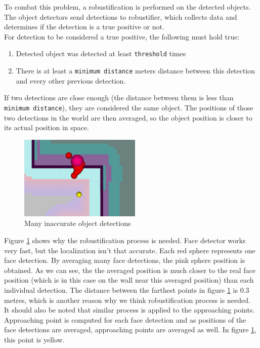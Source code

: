 \documentclass[12pt,a4paper]{article}
\begin{document}
	To combat this problem, a robustification is performed on the detected objects. The object detectors send detections to robustifier, which collects data and determines if the detection is a true positive or not. \\
	
	For detection to be considered a true positive, the following must hold true:
	\begin{enumerate}
		\item Detected object was detected at least \texttt{threshold} times
		\item There is at least a \texttt{minimum distance} meters distance between this detection and every other previous detection.
	\end{enumerate}

	If two detections are close enough (the distance between them is less than \texttt{minimum distance}), they are considered the same object. The positions of those two detections in the world are then averaged, so the object position is closer to its actual position in space.
	
	\begin{figure}[h]
		\centering
		\includegraphics[height=4cm]{images/detections}
		\caption{Many inaccurate object detections}
		\label{fig:inaccurate_detections}
	\end{figure}

	Figure \ref{fig:inaccurate_detections} shows why the robustification process is needed. Face detector works very fast, but the localization isn't that accurate. Each red sphere represents one face detection. By averaging many face detections, the pink sphere position is obtained. As we can see, the the averaged position is much closer to the real face position (which is in this case on the wall near this averaged position) than each individual detection. The distance between the farthest points in figure \ref{fig:inaccurate_detections} is 0.3 metres, which is another reason why we think robustification process is needed. \\
	
	It should also be noted that similar process is applied to the approaching points. Approaching point is computed for each face detection and as positions of the face detections are averaged, approaching points are averaged as well. In figure \ref{fig:inaccurate_detections}, this point is yellow. \\
		
\end{document}
